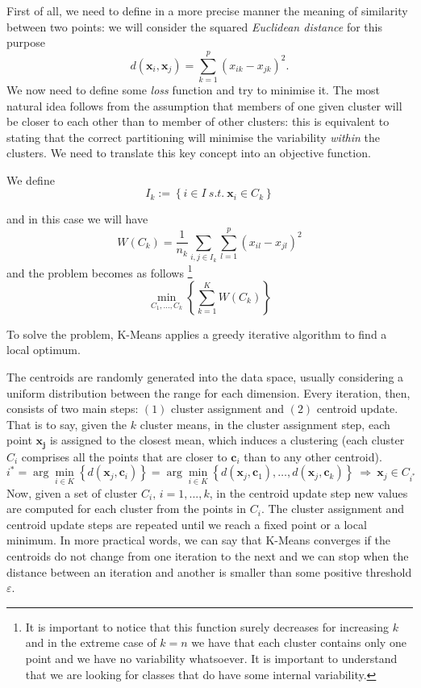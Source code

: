 \documentclass[a4paper]{article}
\begin{document}
	
	First of all, we need to define in a more precise manner
	the meaning of similarity between two points: we will consider the squared \textsl{Euclidean
		distance} for this purpose
	$$
	d(\boldsymbol{x}_{i},\boldsymbol{x}_{j})= \sum_{k = 1}^{p} \left( x_{ik} - x_{jk}
	\right)^{2}.
	$$
	We now need to define some \textsl{loss} function and try to minimise
	it. The most natural idea follows from the assumption that members
	of one given cluster will be closer to each other than to member of
	other clusters: this is equivalent to stating that the correct partitioning
	will minimise the variability \textsl{within} the clusters. We need
	to translate this key concept into an objective function.
	
	We define
	$$
	I_{k}:=\left\{ i\in I\:s.t.\:\boldsymbol{x}_{i}\in C_{k}\right\} 
	$$
	
	and in this case we will have
	$$
	W(C_{k}) = \frac{1}{n_{k}} \underset{i,j\in I_{k}}{\sum} \sum_{l=1}^{p} \left(x_{il}-x_{jl}\right)^{2}
	$$
	and the problem becomes as follows
	\footnote{It is important to notice that this function surely decreases for
		increasing $k$ and in the extreme case of $k=n$ we have that each
		cluster contains only one point and we have no variability whatsoever.
		It is important to understand that we are looking for classes that
		do have some internal variability.}
	$$	\underset{C_{1},\ldots,C_{k}}{\min}\left\{ \sum_{k=1}^{K}W(C_{k})\right\} $$
	
	
	To solve the problem, K-Means applies a greedy iterative algorithm to find a local optimum.
	
	The centroids are randomly generated into the data space, usually considering a uniform distribution between the range for each dimension. Every iteration, then, consists of two main steps: $(1)$ cluster assignment and $(2)$ centroid update. That is to say, given the $k$ cluster means, in the cluster assignment step, each point $\boldsymbol{x_{j}}$ is assigned to the closest mean, which induces a clustering (each cluster $C_{i}$ comprises all the points that are closer to $\boldsymbol{c}_{i}$ than to any other centroid).
	\begin{equation*}
	i^{*}=\arg\underset{i\in K}{ \min}\left\{ d(\boldsymbol{x}_{j},\boldsymbol{c}_{i})\right\} =\arg\min_{i \in K}\left\{ d(\boldsymbol{x}_{j},\boldsymbol{c}_{1}),\ldots,d(\boldsymbol{x}_{j},\boldsymbol{c}_{k})\right\} \:\Longrightarrow\:\boldsymbol{x}_{j}\in C_{i^{*}}
	\end{equation*}
	Now, given a set of cluster $C_{i},\, i=1,...,k$, in the centroid update step new values are computed for each cluster from the points in $C_{i}$. The cluster assignment and centroid update steps are repeated until we reach a fixed point or a local minimum. In more practical words, we can say that K-Means converges if the centroids do not change from one iteration to the next and we can stop when the distance between an iteration and another is smaller than some positive threshold $\varepsilon$.
		
\end{document}

